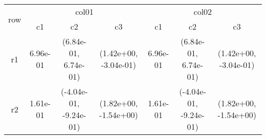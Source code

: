 \begin{tabular}{ccccccc}
\toprule
\multirow{2}{*}{row}&\multicolumn{3}{c}{col01}&\multicolumn{3}{c}{col02}\tabularnewline
\cmidrule(lr){2-4}
\cmidrule(lr){5-7}
&c1&c2&c3&c1&c2&c3\tabularnewline
\midrule
r1&6.96e-01& (6.84e-01, 6.74e-01)& (1.42e+00, -3.04e-01)&6.96e-01& (6.84e-01, 6.74e-01)& (1.42e+00, -3.04e-01)\tabularnewline
r2&1.61e-01& (-4.04e-01, -9.24e-01)& (1.82e+00, -1.54e+00)&1.61e-01& (-4.04e-01, -9.24e-01)& (1.82e+00, -1.54e+00)\tabularnewline
\bottomrule
\end{tabular}
